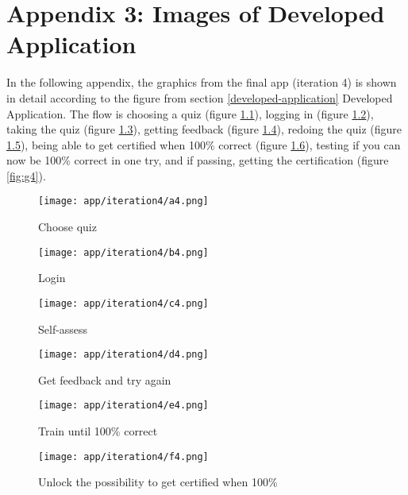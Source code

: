 \chapter{Appendix 3: Images of Developed Application}\label{cha:developed-app}

In the following appendix, the graphics from the final app (iteration 4) is shown in detail according to the figure from section \ref{developed-application} Developed Application. The flow is choosing a quiz (figure \ref{fig:a4}), logging in (figure \ref{fig:b4}), taking the quiz (figure \ref{fig:c4}), getting feedback (figure \ref{fig:d4}), redoing the quiz (figure \ref{fig:e4}), being able to get certified when 100\% correct (figure \ref{fig:f4}), testing if you can now be 100\% correct in one try, and if passing, getting the certification (figure \ref{fig:g4}).

\begin{figure}[h]
    \centering
    \texttt{[image: app/iteration4/a4.png]}
    \caption{Choose quiz}
    \label{fig:a4}
\end{figure}

\begin{figure}[h]
    \centering
    \texttt{[image: app/iteration4/b4.png]}
    \caption{Login}
    \label{fig:b4}
\end{figure}

\begin{figure}[h]
    \centering
    \texttt{[image: app/iteration4/c4.png]}
    \caption{Self-assess}
    \label{fig:c4}
\end{figure}

\begin{figure}[h]
    \centering
    \texttt{[image: app/iteration4/d4.png]}
    \caption{Get feedback and try again}
    \label{fig:d4}
\end{figure}

\begin{figure}[h]
    \centering
    \texttt{[image: app/iteration4/e4.png]}
    \caption{Train until 100\% correct}
    \label{fig:e4}
\end{figure}

\begin{figure}[h]
    \centering
    \texttt{[image: app/iteration4/f4.png]}
    \caption{Unlock the possibility to get certified when 100\%}
    \label{fig:f4}
\end{figure}

